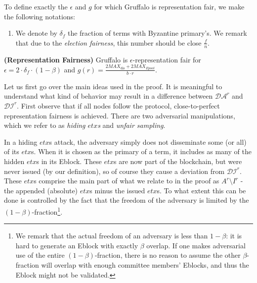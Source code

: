 To define exactly the $\epsilon$ and $g$ for which Gruffalo is representation fair, we make the following notations: 
\begin{enumerate}
    \item We denote by $\delta_f$ the fraction of terms with Byzantine primary's. We remark that due to the \emph{election fairness}, this number should be close $\frac{f}{n}$.
\end{enumerate}

\begin{theorem}{\textbf{(Representation Fairness)}} Gruffalo is $\epsilon$-representation fair for $\epsilon =2\cdot \delta_f\cdot (1-\beta)$ and $g(r)=\frac{2MAX_\text{dis}+2MAX_{Epool}}{b\cdot r}$.
\end{theorem}

Let us first go over the main ideas used in the proof. It is meaningful to understand what kind of behavior may result in a difference between $\mathcal{DA}^r$ and $\mathcal{DI}^r$. First observe that if all nodes follow the protocol, close-to-perfect representation fairness is achieved. 
There are two adversarial manipulations, which we refer to as \emph{hiding $etx$s} and \emph{unfair sampling}.

In a hiding $etx$s attack, the adversary simply does not disseminate some (or all) of its $etx$s. When it is chosen as the primary of a term, it includes as many of the hidden $etx$s in its Eblock. These $etx$s are now part of the blockchain, but were never issued (by our definition), so of course they cause a deviation from $\mathcal{DI}^r$. These $etx$s comprise the main part of what we relate to in the proof as $A^r\setminus I^r$ - the appended (absolute) $etx$s minus the issued $etx$s. To what extent this can be done is controlled by the fact that the freedom of the adversary is limited by the $(1-\beta)$-fraction\footnote{We remark that the actual freedom of an adversary is less than $1-\beta$: it is hard to generate an Eblock with exactly $\beta$ overlap. If one makes adversarial use of the entire $(1-\beta)$-fraction, there is no reason to assume the other $\beta$-fraction will overlap with enough committee members' Eblocks, and thus the Eblock might not be validated.}. 

